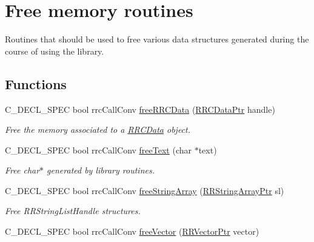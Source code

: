 \hypertarget{group__free_routines}{}\section{Free memory routines}
\label{group__free_routines}


Routines that should be used to free various data structures generated during the course of using the library.  


\subsection*{Functions}
\begin{DoxyCompactItemize}
\item 
\hypertarget{group__free_routines_gaca3178e98973909708974aedef4ece46}{}C\+\_\+\+D\+E\+C\+L\+\_\+\+S\+P\+E\+C bool rrc\+Call\+Conv \hyperlink{group__free_routines_gaca3178e98973909708974aedef4ece46}{free\+R\+R\+C\+Data} (\hyperlink{rrc__types_8h_a9da8b124eb9c3c0045f8926c6a420b4a}{R\+R\+C\+Data\+Ptr} handle)\label{group__free_routines_gaca3178e98973909708974aedef4ece46}

\begin{DoxyCompactList}\small\item\em Free the memory associated to a \hyperlink{struct_r_r_c_data}{R\+R\+C\+Data} object. \end{DoxyCompactList}\item 
\hypertarget{group__free_routines_gae36f30c608631d163e10860353e45e10}{}C\+\_\+\+D\+E\+C\+L\+\_\+\+S\+P\+E\+C bool rrc\+Call\+Conv \hyperlink{group__free_routines_gae36f30c608631d163e10860353e45e10}{free\+Text} (char $\ast$text)\label{group__free_routines_gae36f30c608631d163e10860353e45e10}

\begin{DoxyCompactList}\small\item\em Free char$\ast$ generated by library routines. \end{DoxyCompactList}\item 
C\+\_\+\+D\+E\+C\+L\+\_\+\+S\+P\+E\+C bool rrc\+Call\+Conv \hyperlink{group__free_routines_gaa929a9a3e6a4b4fe2bf6c260266f0b5a}{free\+String\+Array} (\hyperlink{rrc__types_8h_a7c9475df6c7337d99482b13a365e7596}{R\+R\+String\+Array\+Ptr} sl)
\begin{DoxyCompactList}\small\item\em Free R\+R\+String\+List\+Handle structures. \end{DoxyCompactList}\item 
\hypertarget{group__free_routines_gaa6881948e250978168f7661087a27974}{}C\+\_\+\+D\+E\+C\+L\+\_\+\+S\+P\+E\+C bool rrc\+Call\+Conv \hyperlink{group__free_routines_gaa6881948e250978168f7661087a27974}{free\+Vector} (\hyperlink{rrc__types_8h_a3be72d6006034fd349f753d2bf441bf7}{R\+R\+Vector\+Ptr} vector)\label{group__free_routines_gaa6881948e250978168f7661087a27974}


\end{DoxyCompactItemize}
